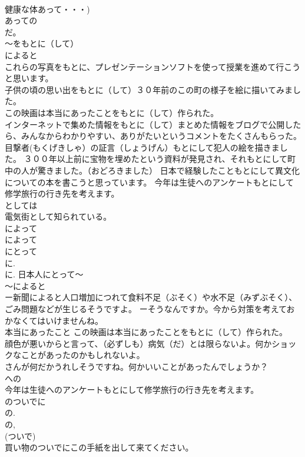 \documentclass[8pt]{extreport}
\begin{document}
\begin{CJK}{UTF8}{min}
\\	健康な体あって・・・) 
\\	あっての
\\	だ。　
\\	～をもとに（して）	
\\	によると 
\\	これらの写真をもとに、プレゼンテーションソフトを使って授業を進めて行こうと思います。 
\\	子供の頃の思い出をもとに（して）３０年前のこの町の様子を絵に描いてみました。 
\\	この映画は本当にあったことをもとに（して）作られた。 
\\	インターネットで集めた情報をもとに（して）まとめた情報をブログで公開したら、みんなからわかりやすい、ありがたいというコメントをたくさんもらった。 
\\	目撃者(もくげきしゃ）の証言（しょうげん）もとにして犯人の絵を描きました。 ３００年以上前に宝物を埋めたという資料が発見され、それもとにして町中の人が驚きました。（おどろきました） 日本で経験したこともとにして異文化についての本を書こうと思っています。 今年は生徒へのアンケートもとにして修学旅行の行き先を考えます。 
\\	としては 
\\	電気街として知られている。　
\\	によって 
\\	によって
\\	にとって 
\\	に. 
\\	に. 日本人にとって～　　
\\	～によると 
\\	ー新聞によると人口増加につれて食料不足（ぶそく）や水不足（みずぶそく）、ごみ問題などが生じるそうですよ。 ーそうなんですか。今から対策を考えておかなくてはいけませんね。
\\	本当にあったこと この映画は本当にあったことをもとに（して）作られた。 
\\	顔色が悪いからと言って、（必ずしも）病気（だ）とは限らないよ。何かショックなことがあったのかもしれないよ。 
\\	さんが何だかうれしそうですね。何かいいことがあったんでしょうか？
\\	への	
\\	今年は生徒へのアンケートもとにして修学旅行の行き先を考えます。
\\	のついでに	
\\	の. 
\\	の, 
\\	(ついで) 
\\	買い物のついでにこの手紙を出して来てください。 

\end{CJK}
\end{document}
